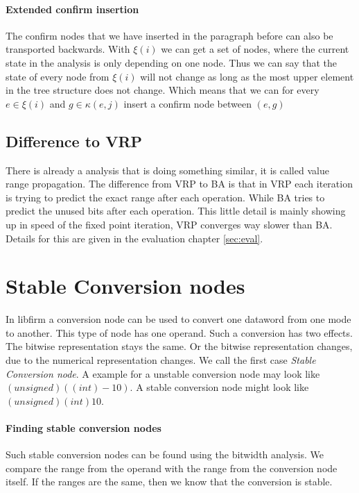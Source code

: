 \paragraph{Extended confirm insertion}
The confirm nodes that we have inserted in the paragraph before can also be transported backwards.
With $\xi(i)$ we can get a set of nodes, where the current state in the analysis is only depending on one node. Thus we can say that the state of every node from $\xi(i)$ will not change as long as the most upper element in the tree structure does not change. Which means that we can for every $e \in \xi(i)$ and $g \in \kappa(e, j)$ insert a confirm node between $(e,g)$

\subsection{Difference to VRP}

There is already a analysis that is doing something similar, it is called value range propagation. The difference from VRP to BA is that in VRP each iteration is trying to predict the exact range after each operation. While BA tries to predict the unused bits after each operation. This little detail is mainly showing up in speed of the fixed point iteration, VRP converges way slower than BA. Details for this are given in the evaluation chapter \ref{sec:eval}.

\section{Stable Conversion nodes}
In libfirm a conversion node can be used to convert one dataword from one mode to another. This type of node has one operand. Such a conversion has two effects. The bitwise representation stays the same. Or the bitwise representation changes, due to the numerical representation changes. We call the first case \textit{Stable Conversion node}.  A example for a unstable conversion node may look like $(unsigned)((int)-10)$. A stable conversion node might look like $(unsigned)(int)10$.

\paragraph{Finding stable conversion nodes}
Such stable conversion nodes can be found using the bitwidth analysis. We compare the range from the operand with the range from the conversion node itself. If the ranges are the same, then we know that the conversion is stable.

